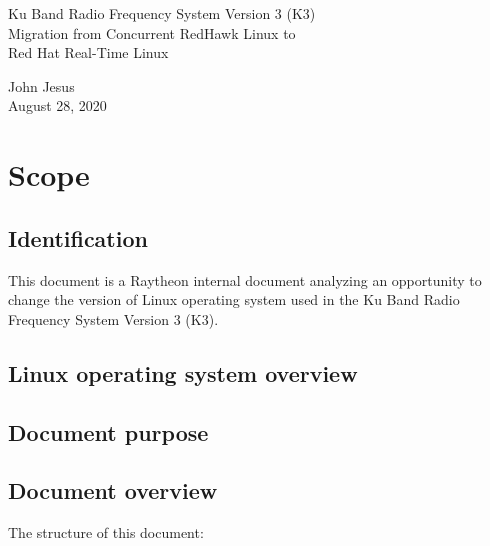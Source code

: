 \documentclass[12pt]{article}
\begin{document}
\thispagestyle{empty}
\begin{titlepage}
\begin{center}
        \vspace*{1cm}

        \LARGE{Ku Band Radio Frequency System Version 3 (K3) \\
        Migration from Concurrent RedHawk Linux to \\
        Red Hat Real-Time Linux}

        \vspace{0.5cm}
        \LARGE

        \vspace{1.5cm}

        \normalsize

        John Jesus \\
        August 28, 2020

        \vfill



        \vspace{0.8cm}




\end{center}
\end{titlepage}

\tableofcontents
\newpage

\section{Scope}
\subsection{Identification}
This document is a Raytheon internal document analyzing an opportunity to change the version of Linux operating system used in the Ku Band Radio Frequency System Version 3 (K3).

\subsection{Linux operating system overview}

\subsection{Document purpose}

\subsection{Document overview}
The structure of this document:
\end{document}
